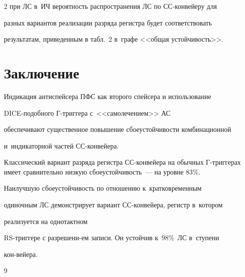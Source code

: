 \begin{multicols}{2}
при ЛС в~ИЧ вероятность распространения ЛС по СС-конв\-ей\-еру для 

разных вариантов реализации разряда регистра будет соответствовать 

результатам, приведенным в табл.~2 в~графе <<общая устойчивость>>.



\vspace*{-6pt}



\section{Заключение}



\vspace*{-2pt}

  

  Индикация антиспейсера ПФС как второго спейсера и использование 

  DICE-по\-доб\-но\-го Г-триг\-ге\-ра с~<<самолечением>> АС 

обеспечивают существенное повышение сбоеустойчивости комбинационной 

и~индикаторной частей    СС-кон\-вей\-ера.

  

  Классический вариант разряда регистра СС-конвейера на обычных Г-триг\-ге\-рах имеет сравнительно низкую сбоеустойчивость~--- на уровне 83\%. 

  

  Наилучшую сбоеустойчивость по отношению к~кратковременным 

одиночным ЛС демонстрирует вариант СС-кон\-вей\-ера, регистр в~котором 

реализуется на однотактном 

  RS-триг\-ге\-ре с разрешени-\linebreak ем записи. Он устойчив к~98\%~ЛС в~ступени 

кон-\linebreak вейера. 



\vspace*{-8pt}



{\small\frenchspacing

 {%


 \begin{thebibliography}{9}


\end{thebibliography}}}
\end{multicols}
